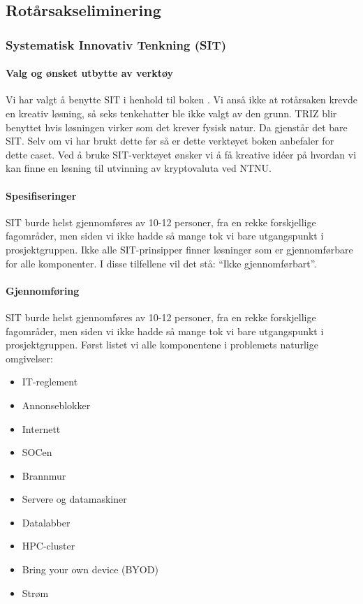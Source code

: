 \subsection{Rotårsakseliminering}
\subsubsection{Systematisk Innovativ Tenkning (SIT)}

\paragraph{Valg og ønsket utbytte av verktøy}
Vi har valgt å benytte SIT i henhold til boken \cite{RCA}. Vi anså ikke at rotårsaken krevde en kreativ løsning, så seks tenkehatter ble ikke valgt av den grunn. TRIZ blir benyttet hvis løsningen virker som det krever fysisk natur. Da gjenstår det bare SIT. Selv om vi har brukt dette før så er dette verktøyet boken anbefaler for dette caset.
Ved å bruke SIT-verktøyet ønsker vi å få kreative idéer på hvordan vi kan finne en løsning til utvinning av kryptovaluta ved NTNU. 

\paragraph{Spesifiseringer}
SIT burde helst gjennomføres av 10-12 personer, fra en rekke forskjellige fagområder, men siden vi ikke hadde så mange tok vi bare utgangspunkt i prosjektgruppen. Ikke alle SIT-prinsipper finner løsninger som er gjennomførbare for alle komponenter. I disse tilfellene vil det stå: ``Ikke gjennomførbart''. 

\paragraph{Gjennomføring}
SIT burde helst gjennomføres av 10-12 personer, fra en rekke forskjellige fagområder, men siden vi ikke hadde så mange tok vi bare utgangspunkt i prosjektgruppen. 
Først listet vi alle komponentene i problemets naturlige omgivelser:
\begin{itemize}
    \item IT-reglement
    \item Annonseblokker
    \item Internett
    \item SOCen
    \item Brannmur
    \item Servere og datamaskiner
    \item Datalabber
    \item HPC-cluster
    \item Bring your own device (BYOD)
    \item Strøm
\end{itemize}

